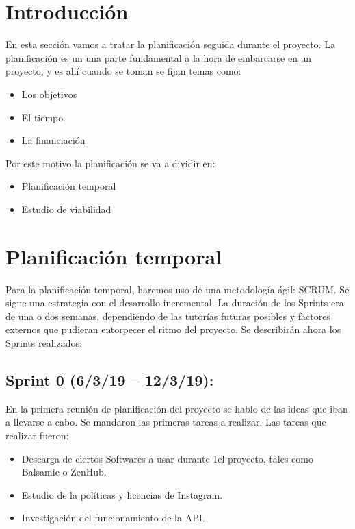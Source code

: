 


\section{Introducción}


En esta sección vamos a tratar la planificación seguida durante el proyecto. La planificación es un una parte fundamental a la hora de embarcarse en un proyecto, y es ahí cuando se toman se fijan temas como:
\begin{itemize}
    \item Los objetivos
    \item El tiempo
    \item La financiación
\end{itemize}
Por este motivo la planificación se va a dividir en:
\begin{itemize}
    \item Planificación temporal
    \item Estudio de viabilidad
\end{itemize}




\section{Planificación temporal}

Para la planificación temporal, haremos uso de una metodología ágil: SCRUM.
Se sigue una estrategia con el desarrollo incremental. La duración de los Sprints era de una o dos semanas, dependiendo de las tutorías futuras posibles y factores externos que pudieran entorpecer el ritmo del proyecto.
Se describirán ahora los Sprints realizados:

\subsection{Sprint 0 (6/3/19 – 12/3/19):}

En la primera reunión de planificación del proyecto se hablo de las ideas que iban a llevarse a cabo. Se mandaron las primeras tareas a realizar.
Las tareas que realizar fueron:
\begin{itemize}
    \item Descarga de ciertos Softwares a usar durante 1el proyecto, tales como Balsamic o ZenHub.
    \item Estudio de la políticas y licencias de Instagram.
    \item Investigación del funcionamiento de la API.
\end{itemize}

